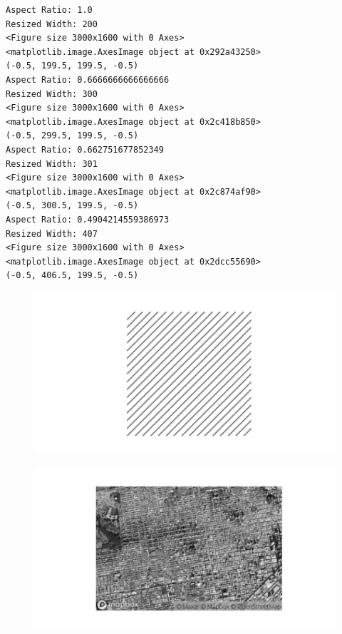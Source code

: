 \documentclass[
  letterpaper,
]{report}
\begin{document}
\begin{verbatim}
Aspect Ratio: 1.0
Resized Width: 200
<Figure size 3000x1600 with 0 Axes>
<matplotlib.image.AxesImage object at 0x292a43250>
(-0.5, 199.5, 199.5, -0.5)
Aspect Ratio: 0.6666666666666666
Resized Width: 300
<Figure size 3000x1600 with 0 Axes>
<matplotlib.image.AxesImage object at 0x2c418b850>
(-0.5, 299.5, 199.5, -0.5)
Aspect Ratio: 0.662751677852349
Resized Width: 301
<Figure size 3000x1600 with 0 Axes>
<matplotlib.image.AxesImage object at 0x2c874af90>
(-0.5, 300.5, 199.5, -0.5)
Aspect Ratio: 0.4904214559386973
Resized Width: 407
<Figure size 3000x1600 with 0 Axes>
<matplotlib.image.AxesImage object at 0x2dcc55690>
(-0.5, 406.5, 199.5, -0.5)
\end{verbatim}

\begin{figure}[H]

{\centering \includegraphics{results_files/figure-pdf/unnamed-chunk-5-1.pdf}

}

\end{figure}

\begin{figure}[H]

{\centering \includegraphics{results_files/figure-pdf/unnamed-chunk-5-2.pdf}

}

\end{figure}
\end{document}
